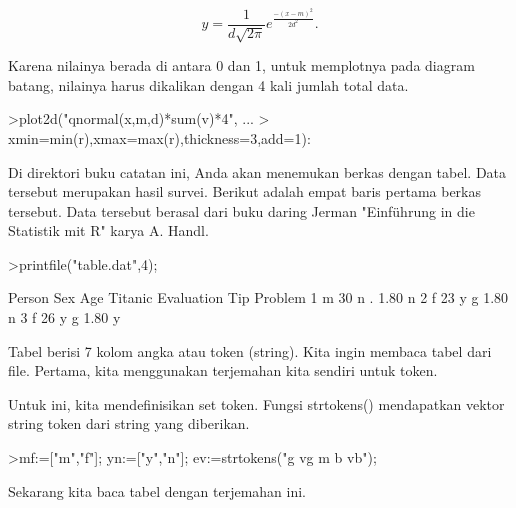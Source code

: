 \documentclass[a4paper,10pt]{article}
\begin{document}
\begin{eulernotebook}
\begin{eulercomment}
\end{eulercomment}
\begin{eulerformula}
\[
y=\frac{1}{d\sqrt{2\pi}}e^{\frac{-(x-m)^2}{2d^2}}.
\]
\end{eulerformula}
\begin{eulercomment}
Karena nilainya berada di antara 0 dan 1, untuk memplotnya pada
diagram batang, nilainya harus dikalikan dengan 4 kali jumlah total
data.
\end{eulercomment}
\begin{eulerprompt}
>plot2d("qnormal(x,m,d)*sum(v)*4", ...
>  xmin=min(r),xmax=max(r),thickness=3,add=1):
\end{eulerprompt}
\begin{eulercomment}
Di direktori buku catatan ini, Anda akan menemukan berkas dengan
tabel. Data tersebut merupakan hasil survei. Berikut adalah empat
baris pertama berkas tersebut. Data tersebut berasal dari buku daring
Jerman "Einführung in die Statistik mit R" karya A. Handl.
\end{eulercomment}
\begin{eulerprompt}
>printfile("table.dat",4);
\end{eulerprompt}
\begin{euleroutput}
  Person Sex Age Titanic Evaluation Tip Problem
  1 m 30 n . 1.80 n
  2 f 23 y g 1.80 n
  3 f 26 y g 1.80 y
\end{euleroutput}
\begin{eulercomment}
Tabel berisi 7 kolom angka atau token (string). Kita ingin membaca
tabel dari file. Pertama, kita menggunakan terjemahan kita sendiri
untuk token.

Untuk ini, kita mendefinisikan set token. Fungsi strtokens()
mendapatkan vektor string token dari string yang diberikan.
\end{eulercomment}
\begin{eulerprompt}
>mf:=["m","f"]; yn:=["y","n"]; ev:=strtokens("g vg m b vb");
\end{eulerprompt}
\begin{eulercomment}
Sekarang kita baca tabel dengan terjemahan ini.


\end{eulercomment}
\end{eulernotebook}
\end{document}
